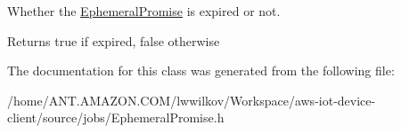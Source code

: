 Whether the \hyperlink{class_aws_1_1_iot_1_1_device_client_1_1_jobs_1_1_ephemeral_promise}{Ephemeral\+Promise} is expired or not. 

\begin{DoxyReturn}{Returns}
true if expired, false otherwise 
\end{DoxyReturn}


The documentation for this class was generated from the following file\+:\begin{DoxyCompactItemize}
\item 
/home/\+A\+N\+T.\+A\+M\+A\+Z\+O\+N.\+C\+O\+M/lwwilkov/\+Workspace/aws-\/iot-\/device-\/client/source/jobs/Ephemeral\+Promise.\+h\end{DoxyCompactItemize}
